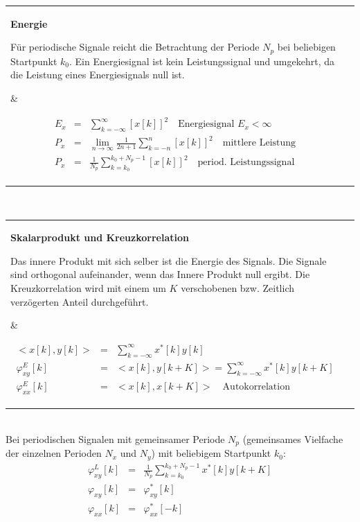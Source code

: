 \begin{tabular}{ll}
 \addtolength{\jot}{2mm}
 \parbox{5cm}{
\begin{center}
 \textbf{Energie}\\
\end{center}
Für periodische Signale reicht die Betrachtung der Periode $N_p$ bei beliebigen Startpunkt $k_0$. Ein Energiesignal ist kein Leistungssignal und umgekehrt, da die Leistung eines Energiesignals null ist.
 }&
 \parbox{6cm}{
 \begin{eqnarray*}
 E_x &=& \sum_{k = -\infty}^{\infty} [x[k]]^2 \quad \text{Energiesignal $E_x < \infty$}\\
 P_x &=& \lim_{n \rightarrow \infty} \frac{1}{2n+1} \sum_{k = -n}^{n} [x[k]]^2 \quad \text{mittlere Leistung}\\
 P_x &=& \frac{1}{N_p} \sum_{k = k_0}^{k_0 + N_p - 1}[x[k]]^2 \quad \text{period. Leistungssignal}
 \end{eqnarray*} }
\end{tabular}\\ \vspace{6pt}
\begin{tabular}{ll}
 \addtolength{\jot}{2mm}
 \parbox{5cm}{
\begin{center}
 \textbf{Skalarprodukt und Kreuzkorrelation}\\
\end{center}
Das innere Produkt mit sich selber ist die Energie des Signals. Die Signale sind orthogonal aufeinander, wenn das Innere Produkt null ergibt. Die Kreuzkorrelation wird mit einem um $K$ verschobenen bzw. Zeitlich verzögerten Anteil durchgeführt.
 }&
 \parbox{6cm}{
 \begin{eqnarray*}
< x[k] , y[k] > &=& \sum_{k = -\infty}^{\infty} x^*[k] y[k]\\
\varphi_{xy}^E [k] &=& < x[k], y[k+K] > = \sum_{k = -\infty}^{\infty} x^*[k] y[k+K]\\
\varphi_{xx}^E [k] &=& < x[k], x[k+K] > \quad \text{Autokorrelation}
 \end{eqnarray*} }
\end{tabular}\vspace{6pt}\\
Bei periodischen Signalen mit gemeinsamer Periode $N_p$ (gemeinsames Vielfache der einzelnen Perioden $N_x$ und $N_y$) mit beliebigem Startpunkt $k_0$:
\begin{eqnarray*}
\varphi_{xy}^{L} [k] &=& \frac{1}{N_p} \sum_{k = k_0}^{k_0 + N_p - 1}x^*[k] y[k+K]\\
\varphi_{xy} [k] &=& \varphi_{xy}^* [k]\\
\varphi_{xx} [k] &=& \varphi_{xx}^* [-k]
\end{eqnarray*}
